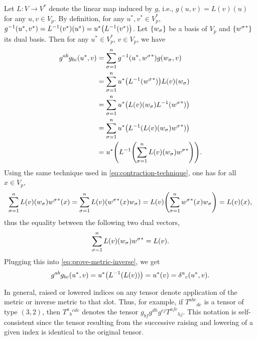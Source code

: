 \documentclass{note}
\numberwithin{equation}{chapter}
\begin{document}
Let $L\colon V\to V^*$ denote the linear map induced by $g$, i.e., $g(u, v) =
    L(v)(u)$ for any $u, v \in V_p$. By definition, for any $u^*, v^* \in V_p^*$,
$g^{-1}(u^*, v^*) = L^{-1}(v^*)(u^*) = u^*\prn{L^{-1}(v^*)}$. Let
$\set{w_\sigma}$ be a basis of $V_p$ and $\set{{w^\sigma}^*}$ its dual basis.
Then for any $u^* \in V_p^*$, $v \in V_p$, we have
\begin{align}
    g^{ab}g_{bc}(u^*, v)
     & = \sum_{\sigma=1}^n g^{-1}\prn{u^*, {w^\sigma}^*} g\prn{w_\sigma, v} \notag     \\
     & = \sum_{\sigma=1}^n u^*\prn{L^{-1}\prn{{w^\sigma}^*}} L(v)\prn{w_\sigma} \notag \\
     & = \sum_{\sigma=1}^n u^*\prn{L(v)\prn{w_\sigma}L^{-1}\prn{{w^\sigma}^*}} \notag  \\
     & = \sum_{\sigma=1}^n u^*\prn{L^{-1}\prn{L(v)\prn{w_\sigma}{w^\sigma}^*}} \notag  \\
     & = u^*\prn{L^{-1}\prn{\sum_{\sigma=1}^n L(v)\prn{w_\sigma}{w^\sigma}^*}}.
    \label{eq:prove-metric-inverse}
\end{align}
Using the same technique used in \eqref{eq:contraction-technique}, one has for
all $x \in V_p$,
\begin{equation*}
    \sum_{\sigma=1}^n L(v)\prn{w_\sigma}{w^\sigma}^*(x) = \sum_{\sigma=1}^n
    L(v)\prn{{w^\sigma}^*(x) w_\sigma} = L(v)\prn{\sum_{\sigma=1}^n {w^\sigma}^*(x)
    w_\sigma} = L(v)(x),
\end{equation*}
thus the equality between the following two dual vectors,
\begin{equation*}
    \sum_{\sigma=1}^n L(v)\prn{w_\sigma}{w^\sigma}^* = L(v).
\end{equation*}
Plugging this into \eqref{eq:prove-metric-inverse}, we get
\begin{equation*}
    g^{ab}g_{bc}(u^*, v) = u^*\prn{L^{-1}(L(v))} = u^*(v) =
    {\delta^a}_c\prn{u^*,v}.
\end{equation*}

\begin{quotebar}
    In general, raised or lowered indices on any tensor denote application of the
    metric or inverse metric to that slot. Thus, for example, if $T^{abc}{}_{de}$
    is a tensor of type $(3,2)$, then $T^a{}_b{}^{cde}$ denotes the tensor
    $g_{bf}g^{dh}g^{ej}T^{afc}{}_{hj}$. This notation is self-consistent since the
    tensor resulting from the successive raising and lowering of a given index is
    identical to the original tensor.
\end{quotebar}
\end{document}
